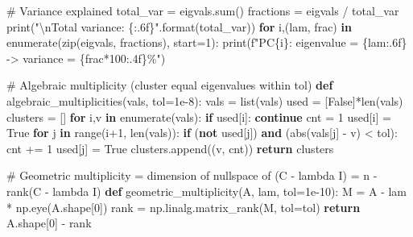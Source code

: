 \documentclass[
  letterpaper,
  DIV=11,
  numbers=noendperiod]{scrreprt}
\newenvironment{Shaded}{\begin{snugshade}}{\end{snugshade}}
\newcommand{\BuiltInTok}[1]{\textcolor[rgb]{0.00,0.23,0.31}{#1}}
\newcommand{\CharTok}[1]{\textcolor[rgb]{0.13,0.47,0.30}{#1}}
\newcommand{\CommentTok}[1]{\textcolor[rgb]{0.37,0.37,0.37}{#1}}
\newcommand{\ControlFlowTok}[1]{\textcolor[rgb]{0.00,0.23,0.31}{\textbf{#1}}}
\newcommand{\DecValTok}[1]{\textcolor[rgb]{0.68,0.00,0.00}{#1}}
\newcommand{\FloatTok}[1]{\textcolor[rgb]{0.68,0.00,0.00}{#1}}
\newcommand{\KeywordTok}[1]{\textcolor[rgb]{0.00,0.23,0.31}{\textbf{#1}}}
\newcommand{\NormalTok}[1]{\textcolor[rgb]{0.00,0.23,0.31}{#1}}
\newcommand{\OperatorTok}[1]{\textcolor[rgb]{0.37,0.37,0.37}{#1}}
\newcommand{\SpecialCharTok}[1]{\textcolor[rgb]{0.37,0.37,0.37}{#1}}
\newcommand{\SpecialStringTok}[1]{\textcolor[rgb]{0.13,0.47,0.30}{#1}}
\newcommand{\StringTok}[1]{\textcolor[rgb]{0.13,0.47,0.30}{#1}}
\newcommand{\VariableTok}[1]{\textcolor[rgb]{0.07,0.07,0.07}{#1}}
\begin{document}
\begin{Shaded}
\begin{Highlighting}[]
\CommentTok{\# Variance explained}
\NormalTok{total\_var }\OperatorTok{=}\NormalTok{ eigvals.}\BuiltInTok{sum}\NormalTok{()}
\NormalTok{fractions }\OperatorTok{=}\NormalTok{ eigvals }\OperatorTok{/}\NormalTok{ total\_var}
\BuiltInTok{print}\NormalTok{(}\StringTok{"}\CharTok{\textbackslash{}n}\StringTok{Total variance: }\SpecialCharTok{\{:.6f\}}\StringTok{"}\NormalTok{.}\BuiltInTok{format}\NormalTok{(total\_var))}
\ControlFlowTok{for}\NormalTok{ i,(lam, frac) }\KeywordTok{in} \BuiltInTok{enumerate}\NormalTok{(}\BuiltInTok{zip}\NormalTok{(eigvals, fractions), start}\OperatorTok{=}\DecValTok{1}\NormalTok{):}
    \BuiltInTok{print}\NormalTok{(}\SpecialStringTok{f"PC}\SpecialCharTok{\{}\NormalTok{i}\SpecialCharTok{\}}\SpecialStringTok{: eigenvalue = }\SpecialCharTok{\{}\NormalTok{lam}\SpecialCharTok{:.6f\}}\SpecialStringTok{  {-}\textgreater{} variance = }\SpecialCharTok{\{}\NormalTok{frac}\OperatorTok{*}\DecValTok{100}\SpecialCharTok{:.4f\}}\SpecialStringTok{\%"}\NormalTok{)}

\CommentTok{\# Algebraic multiplicity (cluster equal eigenvalues within tol)}
\KeywordTok{def}\NormalTok{ algebraic\_multiplicities(vals, tol}\OperatorTok{=}\FloatTok{1e{-}8}\NormalTok{):}
\NormalTok{    vals }\OperatorTok{=} \BuiltInTok{list}\NormalTok{(vals)}
\NormalTok{    used }\OperatorTok{=}\NormalTok{ [}\VariableTok{False}\NormalTok{]}\OperatorTok{*}\BuiltInTok{len}\NormalTok{(vals)}
\NormalTok{    clusters }\OperatorTok{=}\NormalTok{ []}
    \ControlFlowTok{for}\NormalTok{ i,v }\KeywordTok{in} \BuiltInTok{enumerate}\NormalTok{(vals):}
        \ControlFlowTok{if}\NormalTok{ used[i]:}
            \ControlFlowTok{continue}
\NormalTok{        cnt }\OperatorTok{=} \DecValTok{1}
\NormalTok{        used[i] }\OperatorTok{=} \VariableTok{True}
        \ControlFlowTok{for}\NormalTok{ j }\KeywordTok{in} \BuiltInTok{range}\NormalTok{(i}\OperatorTok{+}\DecValTok{1}\NormalTok{, }\BuiltInTok{len}\NormalTok{(vals)):}
            \ControlFlowTok{if}\NormalTok{ (}\KeywordTok{not}\NormalTok{ used[j]) }\KeywordTok{and}\NormalTok{ (}\BuiltInTok{abs}\NormalTok{(vals[j] }\OperatorTok{{-}}\NormalTok{ v) }\OperatorTok{\textless{}}\NormalTok{ tol):}
\NormalTok{                cnt }\OperatorTok{+=} \DecValTok{1}
\NormalTok{                used[j] }\OperatorTok{=} \VariableTok{True}
\NormalTok{        clusters.append((v, cnt))}
    \ControlFlowTok{return}\NormalTok{ clusters}

\CommentTok{\# Geometric multiplicity = dimension of nullspace of (C {-} lambda I) = n {-} rank(C {-} lambda I)}
\KeywordTok{def}\NormalTok{ geometric\_multiplicity(A, lam, tol}\OperatorTok{=}\FloatTok{1e{-}10}\NormalTok{):}
\NormalTok{    M }\OperatorTok{=}\NormalTok{ A }\OperatorTok{{-}}\NormalTok{ lam }\OperatorTok{*}\NormalTok{ np.eye(A.shape[}\DecValTok{0}\NormalTok{])}
\NormalTok{    rank }\OperatorTok{=}\NormalTok{ np.linalg.matrix\_rank(M, tol}\OperatorTok{=}\NormalTok{tol)}
    \ControlFlowTok{return}\NormalTok{ A.shape[}\DecValTok{0}\NormalTok{] }\OperatorTok{{-}}\NormalTok{ rank}


\end{Highlighting}
\end{Shaded}
\end{document}
